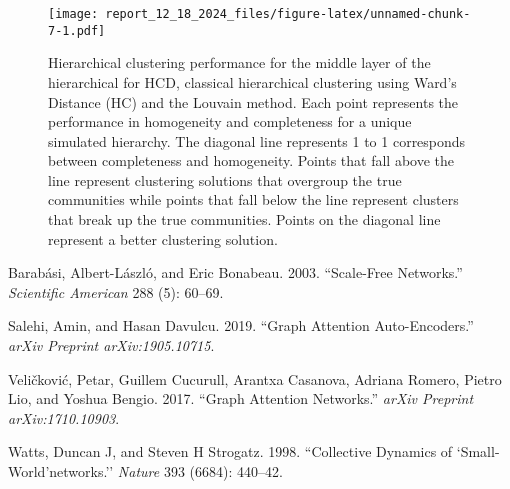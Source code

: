 \documentclass[
]{article}
\newlength{\cslhangindent}
\newenvironment{CSLReferences}[2] %
 {\begin{list}{}{%
  \setlength{\itemindent}{0pt}
  \setlength{\leftmargin}{0pt}
  \setlength{\parsep}{0pt}
  \ifodd #1
   \setlength{\leftmargin}{\cslhangindent}
   \setlength{\itemindent}{-1\cslhangindent}
  \fi
  \setlength{\itemsep}{#2\baselineskip}}}
 {\end{list}}
\begin{document}
\begin{figure}
\centering
\texttt{[image: report\_12\_18\_2024\_files/figure-latex/unnamed-chunk-7-1.pdf]}
\caption{Hierarchical clustering performance for the middle layer of the
hierarchical for HCD, classical hierarchical clustering using Ward's
Distance (HC) and the Louvain method. Each point represents the
performance in homogeneity and completeness for a unique simulated
hierarchy. The diagonal line represents 1 to 1 corresponds between
completeness and homogeneity. Points that fall above the line represent
clustering solutions that overgroup the true communities while points
that fall below the line represent clusters that break up the true
communities. Points on the diagonal line represent a better clustering
solution.}
\end{figure}

\label{refs}
\begin{CSLReferences}{1}{0}
Barabási, Albert-László, and Eric Bonabeau. 2003. {``Scale-Free
Networks.''} \emph{Scientific American} 288 (5): 60--69.

Salehi, Amin, and Hasan Davulcu. 2019. {``Graph Attention
Auto-Encoders.''} \emph{arXiv Preprint arXiv:1905.10715}.

Veličković, Petar, Guillem Cucurull, Arantxa Casanova, Adriana Romero,
Pietro Lio, and Yoshua Bengio. 2017. {``Graph Attention Networks.''}
\emph{arXiv Preprint arXiv:1710.10903}.

Watts, Duncan J, and Steven H Strogatz. 1998. {``Collective Dynamics of
`Small-World'networks.''} \emph{Nature} 393 (6684): 440--42.

\end{CSLReferences}
\end{document}
